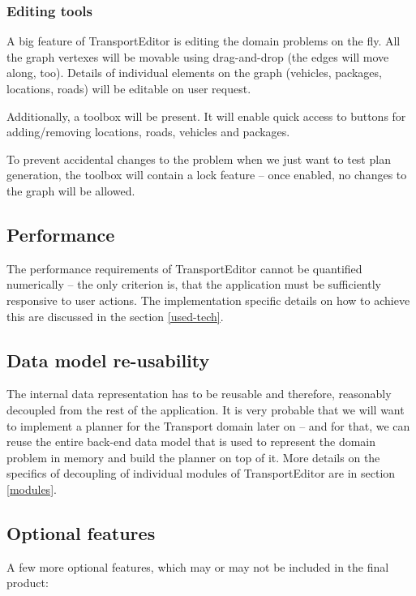 \documentclass[10pt,a4paper,oneside]{article}
\newcommand{\pname}{TransportEditor} %
\begin{document}
\subsubsection{Editing tools}

A big feature of \pname{} is editing the domain problems on the fly.
All the graph vertexes will be movable using drag-and-drop (the edges will move along, too).
Details of individual elements on the graph (vehicles, packages, locations, roads) will be editable
on user request.

Additionally, a toolbox will be present. It will enable quick access to buttons for adding/removing locations, roads, vehicles and packages.

To prevent accidental changes to the problem when we just want to test plan generation,
the toolbox will contain a lock feature -- once enabled, no changes to the graph will be allowed.

\subsection{Performance}

The performance requirements of \pname{} cannot be quantified numerically -- the only criterion is, that the application must be sufficiently
responsive to user actions. The implementation specific details on how to achieve this are discussed in the section \ref{used-tech}.

\subsection{Data model re-usability}

The internal data representation has to be reusable and therefore, reasonably decoupled from the rest of the application.
It is very probable that we will want to implement a planner for the Transport domain later on
-- and for that, we can reuse the entire back-end data model that is used to represent the domain problem in memory
and build the planner on top of it.
More details on the specifics of decoupling of individual modules of \pname{} are in section \ref{modules}.

\subsection{Optional features}

A few more optional features, which may or may not be included in the final product:
\end{document}

